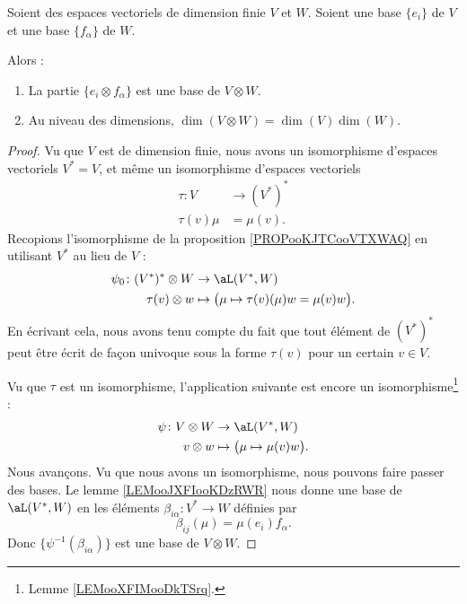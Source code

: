 \begin{proposition}      \label{PROPooTHDPooWgjUwk}
	Soient des espaces vectoriels de dimension finie \( V\) et \( W\). Soient une base \( \{e_i\}\) de \( V\) et une base \( \{f_{\alpha}\}\) de \( W\).

	Alors :
	\begin{enumerate}
		\item       \label{ITEMooQCILooUncdGl}
		      La partie \( \{e_i\otimes f_{\alpha}\}\) est une base de \( V\otimes W\).
		\item
		      Au niveau des dimensions, \( \dim(V\otimes W)=\dim(V)\dim(W)\).
	\end{enumerate}
\end{proposition}

\begin{proof}
	Vu que \( V\) est de dimension finie, nous avons un isomorphisme d'espaces vectoriels \( V^*=V\), et même un isomorphisme d'espaces vectoriels
	\begin{equation}
		\begin{aligned}
			\tau\colon V & \to (V^*)^* \\
			\tau(v)\mu   & =\mu(v).
		\end{aligned}
	\end{equation}
	Recopions l'isomorphisme de la proposition \ref{PROPooKJTCooVTXWAQ} en utilisant \( V^*\) au lieu de \( V\) :
	\begin{equation}
		\begin{aligned}
			\psi_0\colon (V^*)^*\otimes W & \to \aL(V^*,W)                                         \\
			\tau(v)\otimes w              & \mapsto \big( \mu\mapsto \tau(v)(\mu)w =\mu(v)w \big).
		\end{aligned}
	\end{equation}
	En écrivant cela, nous avons tenu compte du fait que tout élément de \( (V^*)^*\) peut être écrit de façon univoque sous la forme \( \tau(v)\) pour un certain \( v\in V\).

	Vu que \( \tau\) est un isomorphisme, l'application suivante est encore un isomorphisme\footnote{Lemme \ref{LEMooXFIMooDkTSrq}.} :
	\begin{equation}        \label{EQooAEFRooPfmAnj}
		\begin{aligned}
			\psi\colon V\otimes W & \to \aL(V^*,W)                          \\
			v\otimes w            & \mapsto \big( \mu\mapsto \mu(v)w \big).
		\end{aligned}
	\end{equation}
	Nous avançons. Vu que nous avons un isomorphisme, nous pouvons faire passer des bases. Le lemme \ref{LEMooJXFIooKDzRWR} nous donne une base de \( \aL(V^*,W)\) en les éléments \( \beta_{i\alpha}\colon V^*\to W\) définies par
	\begin{equation}
		\beta_{ij}(\mu)=\mu(e_i)f_{\alpha}.
	\end{equation}
	Donc \( \{ \psi^{-1}(\beta_{i\alpha}) \}\) est une base de \( V\otimes W\).


\end{proof}
